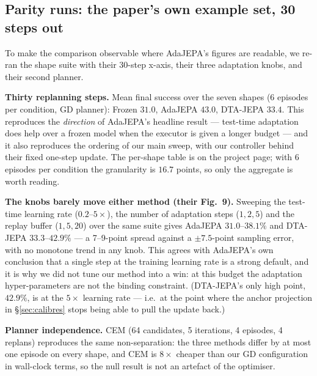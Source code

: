 \subsection{Parity runs: the paper's own example set, 30 steps out}\label{sec:parity}

To make the comparison observable where AdaJEPA's figures are readable, we re-ran the shape
suite with their 30-step x-axis, their three adaptation knobs, and their second planner.

\textbf{Thirty replanning steps.} Mean final success over the seven shapes (6 episodes per
condition, GD planner): Frozen $31.0$, AdaJEPA $43.0$, DTA-JEPA $33.4$. This reproduces the
\emph{direction} of AdaJEPA's headline result --- test-time adaptation does help over a frozen
model when the executor is given a longer budget --- and it also reproduces the ordering of our
main sweep, with our controller behind their fixed one-step update. The per-shape table is on
the project page; with 6 episodes per condition the granularity is $16.7$ points, so only the
aggregate is worth reading.

\textbf{The knobs barely move either method (their Fig.~9).} Sweeping the test-time learning
rate ($0.2$--$5\times$), the number of adaptation steps ($1,2,5$) and the replay buffer
($1,5,20$) over the same suite gives AdaJEPA $31.0$--$38.1\%$ and DTA-JEPA $33.3$--$42.9\%$
--- a 7--9-point spread against a $\pm 7.5$-point sampling error, with no monotone trend in any
knob. This agrees with AdaJEPA's own conclusion that a single step at the training learning
rate is a strong default, and it is why we did not tune our method into a win: at this budget
the adaptation hyper-parameters are not the binding constraint. (DTA-JEPA's only high point,
$42.9\%$, is at the $5\times$ learning rate --- i.e.\ at the point where the anchor projection
in \S\ref{sec:calibres} stops being able to pull the update back.)

\textbf{Planner independence.} CEM (64 candidates, 5 iterations, 4 episodes, 4 replans)
reproduces the same non-separation: the three methods differ by at most one episode on every
shape, and CEM is $8\times$ cheaper than our GD configuration in wall-clock terms, so the null
result is not an artefact of the optimiser.


